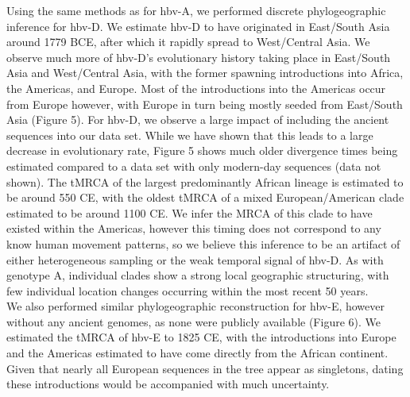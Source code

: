 Using the same methods as for \gls{hbv}-A, we performed discrete phylogeographic inference for \gls{hbv}-D. We estimate \gls{hbv}-D to have originated in East/South Asia around 1779 BCE, after which it rapidly spread to West/Central Asia. We observe much more of \gls{hbv}-D's evolutionary history taking place in East/South Asia and West/Central Asia, with the former spawning introductions into Africa, the Americas, and Europe. Most of the introductions into the Americas occur from Europe however, with Europe in turn being mostly seeded from East/South Asia (Figure 5). For \gls{hbv}-D, we observe a large impact of including the ancient sequences into our data set. While we have shown that this leads to a large decrease in evolutionary rate, Figure 5 shows much older divergence times being estimated compared to a data set with only modern-day sequences (data not shown). The tMRCA of the largest predominantly African lineage is estimated to be around 550 CE, with the oldest tMRCA of a mixed European/American clade estimated to be around 1100 CE. We infer the MRCA of this clade to have existed within the Americas, however this timing does not correspond to any know human movement patterns, so we believe this inference to be an artifact of either heterogeneous sampling or the weak temporal signal of \gls{hbv}-D. As with genotype A, individual clades show a strong local geographic structuring, with few individual location changes occurring within the most recent 50 years.\\

We also performed similar phylogeographic reconstruction for \gls{hbv}-E, however without any ancient genomes, as none were publicly available (Figure 6). We estimated the tMRCA of \gls{hbv}-E to 1825 CE, with the introductions into Europe and the Americas estimated to have come directly from the African continent. Given that nearly all European sequences in the tree appear as singletons, dating these introductions would be accompanied with much uncertainty.


